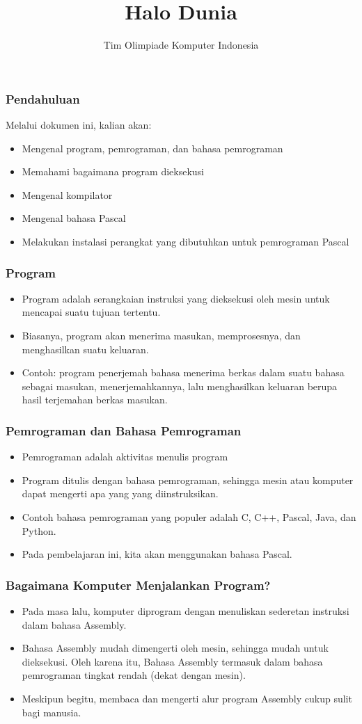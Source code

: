 \documentclass{beamer}
\title{Halo Dunia}
\author{Tim Olimpiade Komputer Indonesia}
\begin{document}
\begin{frame}
\titlepage
\end{frame}

\begin{frame}
\frametitle{Pendahuluan}
Melalui dokumen ini, kalian akan:
\begin{itemize}
	\item Mengenal program, pemrograman, dan bahasa pemrograman
	\item Memahami bagaimana program dieksekusi
	\item Mengenal kompilator
	\item Mengenal bahasa Pascal
	\item Melakukan instalasi perangkat yang dibutuhkan untuk pemrograman Pascal
\end{itemize}
\end{frame}

\begin{frame}
\frametitle{Program}
\begin{itemize}
	\item Program adalah serangkaian instruksi yang dieksekusi oleh mesin untuk mencapai suatu tujuan tertentu.
	\item Biasanya, program akan menerima masukan, memprosesnya, dan menghasilkan suatu keluaran.
	\item Contoh: program penerjemah bahasa menerima berkas dalam suatu bahasa sebagai masukan, menerjemahkannya, lalu menghasilkan keluaran berupa hasil terjemahan berkas masukan.
\end{itemize}
\end{frame}

\begin{frame}
\frametitle{Pemrograman dan Bahasa Pemrograman}
\begin{itemize}
	\item Pemrograman adalah aktivitas menulis program
	\item Program ditulis dengan bahasa pemrograman, sehingga mesin atau komputer dapat mengerti apa yang yang diinstruksikan.
	\item Contoh bahasa pemrograman yang populer adalah C, C++, Pascal, Java, dan Python. 
	\item Pada pembelajaran ini, kita akan menggunakan bahasa Pascal.
\end{itemize}
\end{frame}

\begin{frame}
\frametitle{Bagaimana Komputer Menjalankan Program?}
\begin{itemize}
	\item Pada masa lalu, komputer diprogram dengan menuliskan sederetan instruksi dalam bahasa Assembly.
	\item Bahasa Assembly mudah dimengerti oleh mesin, sehingga mudah untuk dieksekusi. Oleh karena itu, Bahasa Assembly termasuk dalam bahasa pemrograman tingkat rendah (dekat dengan mesin).
	\item Meskipun begitu, membaca dan mengerti alur program Assembly cukup sulit bagi manusia.
\end{itemize}
\end{frame}
\end{document}
